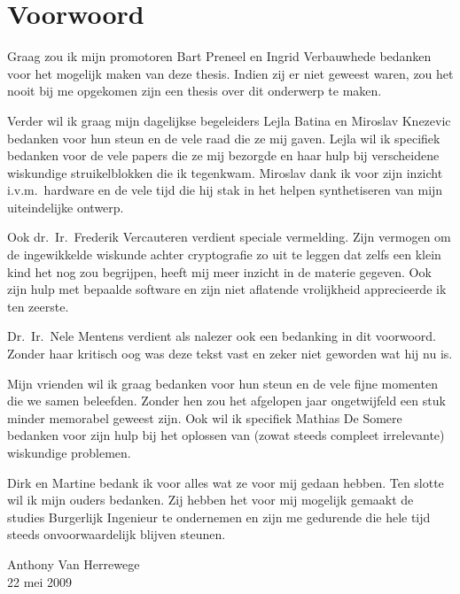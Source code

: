 \chapter*{Voorwoord}

Graag zou ik mijn promotoren Bart Preneel en Ingrid Verbauwhede bedanken voor het mogelijk maken van deze thesis. Indien zij er niet geweest waren, zou het nooit bij me opgekomen zijn een thesis over dit onderwerp te maken.

Verder wil ik graag mijn dagelijkse begeleiders Lejla Batina en Miroslav Knezevic bedanken voor hun steun en de vele raad die ze mij gaven. Lejla wil ik specifiek bedanken voor de vele papers die ze mij bezorgde en haar hulp bij verscheidene wiskundige struikelblokken die ik tegenkwam. Miroslav dank ik voor zijn inzicht i.v.m.\ hardware en de vele tijd die hij stak in het helpen synthetiseren van mijn uiteindelijke ontwerp.

Ook dr.\ Ir.\ Frederik Vercauteren verdient speciale vermelding. Zijn vermogen om de ingewikkelde wiskunde achter cryptografie zo uit te leggen dat zelfs een klein kind het nog zou begrijpen, heeft mij meer inzicht in de materie gegeven. Ook zijn hulp met bepaalde software en zijn niet aflatende vrolijkheid apprecieerde ik ten zeerste.

Dr.\ Ir.\ Nele Mentens verdient als nalezer ook een bedanking in dit voorwoord. Zonder haar kritisch oog was deze tekst vast en zeker niet geworden wat hij nu is.

Mijn vrienden wil ik graag bedanken voor hun steun en de vele fijne momenten die we samen beleefden. Zonder hen zou het afgelopen jaar ongetwijfeld een stuk minder memorabel geweest zijn. Ook wil ik specifiek Mathias De Somere bedanken voor zijn hulp bij het oplossen van (zowat steeds compleet irrelevante) wiskundige problemen.

Dirk en Martine bedank ik voor alles wat ze voor mij gedaan hebben. Ten slotte wil ik mijn ouders bedanken. Zij hebben het voor mij mogelijk gemaakt de studies Burgerlijk Ingenieur te ondernemen en zijn me gedurende die hele tijd steeds onvoorwaardelijk blijven steunen. 

\bigskip \bigskip
{\raggedleft	%
Anthony Van Herrewege\\
22 mei 2009\\
}
